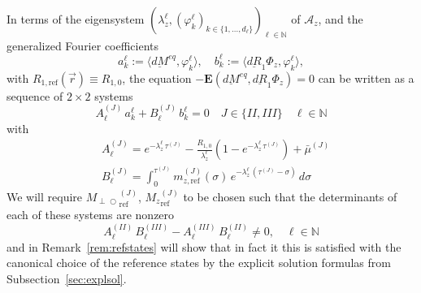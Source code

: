 \documentclass{ws-m3as}
\newcommand{\uld}[1]{\underline{d#1}}
\def\Mpp{M_{\perp\!\!\!\!\!\bigcirc}}
\begin{document}
In terms of the eigensystem $(\lambda_z^\ell,(\varphi^\ell_k)_{k\in\{1,\ldots,d_\ell\}})_{\ell\in\mathbb{N}}$ of $\mathcal{A}_z$, and the generalized Fourier coefficients
\[
a^\ell_k:=\langle \uld{M}^{eq},\varphi^\ell_k\rangle, \quad
b^\ell_k:=\langle \uld{R}_1\Phi_z,\varphi^\ell_k\rangle, 
\]
with $R_{1,\text{ref}}(\vec r)\equiv R_{1,0}$, the equation $-\mathbf{E}(\uld{M}^{eq},\uld{R}_1 \Phi_z)=0$ can be written as a sequence of $2\times2$ systems
\begin{equation}\label{sysab}
A_\ell^{(J)} \, a^\ell_k 
+ B_\ell^{(J)} \, b^\ell_k=0 \quad J\in\{II,III\} \quad \ell\in\mathbb{N}
\end{equation}
with 
\begin{equation}\label{AellJBellJ}
\begin{aligned}
&A_\ell^{(J)}=e^{-\lambda_z^\ell\,\tau^{(J)}}
-\frac{R_{1,0}}{\lambda_z^\ell}(1-e^{-\lambda_z^\ell\,\tau^{(J)}})+\bar{\mu}^{(J)}\\
&B_\ell^{(J)}=\int_0^{\tau^{(J)}} m_{z,\text{ref}}^{(J)}(\sigma)\,e^{-\lambda_z^\ell\,(\tau^{(J)}-\sigma)}\, d\sigma
\end{aligned}
\end{equation}
We will require ${\Mpp}_{\text{ref}}^{(J)}$, ${M_z}_{\text{ref}}^{(J)}$ to be chosen such that the determinants of each of these systems are nonzero
\begin{equation}\label{det_ell}
A_\ell^{(II)}\, B_\ell^{(III)}-A_\ell^{(III)}\, B_\ell^{(II)}\not=0, \quad \ell\in\mathbb{N}
\end{equation}
and in Remark~\ref{rem:refstates} will show that in fact it this is satisfied with the canonical choice of the reference states by the explicit solution formulas from Subsection~\ref{sec:explsol}.
\end{document}

